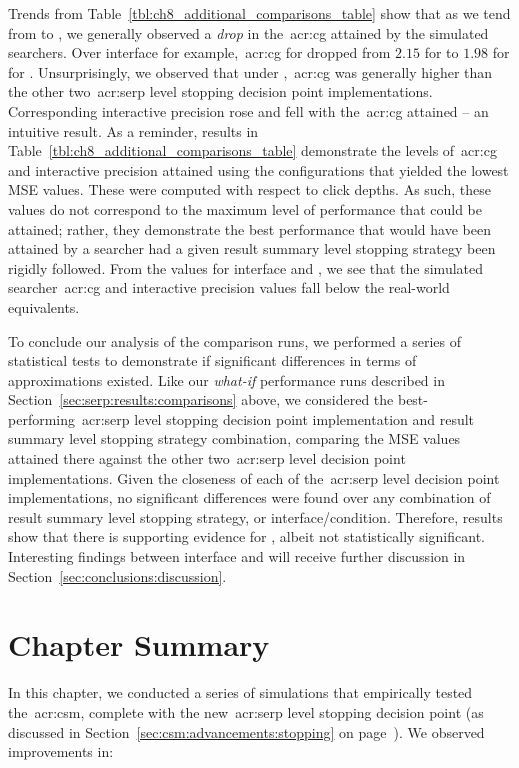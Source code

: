 Trends from Table~\ref{tbl:ch8_additional_comparisons_table} show that as we tend from  to , we generally observed a \emph{drop} in the~\gls{acr:cg} attained by the simulated searchers. Over interface  for example,~\gls{acr:cg} for  dropped from $2.15$ for  to $1.98$ for  for . Unsurprisingly, we observed that under ,~\gls{acr:cg} was generally higher than the other two~\gls{acr:serp} level stopping decision point implementations. Corresponding interactive precision rose and fell with the~\gls{acr:cg} attained -- an intuitive result. As a reminder, results in Table~\ref{tbl:ch8_additional_comparisons_table} demonstrate the levels of~\gls{acr:cg} and interactive precision attained using the configurations that yielded the lowest MSE values. These were computed with respect to click depths. As such, these values do not correspond to the maximum level of performance that could be attained; rather, they demonstrate the best performance that would have been attained by a searcher had a given result summary level stopping strategy been rigidly followed. From the  values for interface  and , we see that the simulated searcher~\gls{acr:cg} and interactive precision values fall below the real-world equivalents.

To conclude our analysis of the comparison runs, we performed a series of statistical tests to demonstrate if significant differences in terms of approximations existed. Like our \emph{what-if} performance runs described in Section~\ref{sec:serp:results:comparisons} above, we considered the best-performing~\gls{acr:serp} level stopping decision point implementation and result summary level stopping strategy combination, comparing the MSE values attained there against the other two~\gls{acr:serp} level decision point implementations. Given the closeness of each of the~\gls{acr:serp} level decision point implementations, no significant differences were found over any combination of result summary level stopping strategy, or interface/condition. Therefore, results show that there is supporting evidence for , albeit not statistically significant. Interesting findings between interface  and  will receive further discussion in Section~\ref{sec:conclusions:discussion}.

\section{Chapter Summary}
In this chapter, we conducted a series of simulations that empirically tested the~\gls{acr:csm}, complete with the new~\gls{acr:serp} level stopping decision point (as discussed in Section~\ref{sec:csm:advancements:stopping} on page~\pageref{sec:csm:advancements:stopping}). We observed improvements in:

